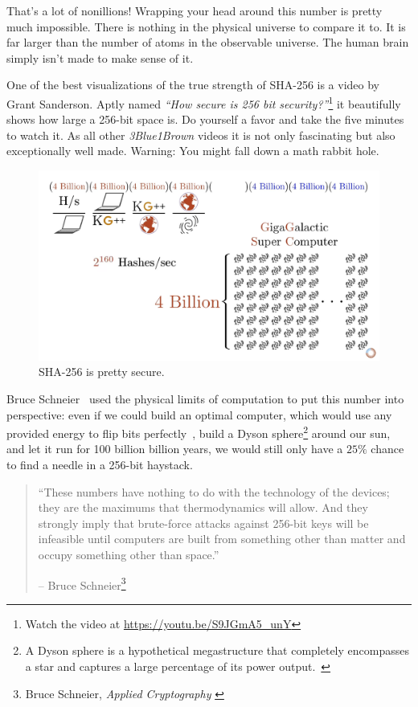 That's a lot of nonillions! Wrapping your head around this number is
pretty much impossible. There is nothing in the physical universe to
compare it to. It is far larger than the number of atoms in the
observable universe. The human brain simply isn't made to make sense of
it.

\newpage

One of the best visualizations of the true strength of SHA-256 is a video by
Grant Sanderson. Aptly named \textit{\enquote{How secure is 256 bit
security?}}\footnote{Watch the video at \url{https://youtu.be/S9JGmA5_unY}} it
beautifully shows how large a 256-bit space is. Do yourself a favor and take the
five minutes to watch it. As all other \textit{3Blue1Brown} videos it is not
only fascinating but also exceptionally well made. Warning: You might fall down
a math rabbit hole.

\begin{figure}
  \includegraphics{assets/images/youtube-vid-inverted.png}
  \caption{SHA-256 is pretty secure.}
  \label{fig:youtube-vid-inverted}
\end{figure}

Bruce Schneier~\cite{web:schneier} used the physical limits of computation to put this
number into perspective: even if we could build an optimal computer,
which would use any provided energy to flip bits perfectly~\cite{wiki:landauer}, build a
Dyson sphere\footnote{A Dyson sphere is a hypothetical megastructure that completely encompasses a star and captures a large percentage of its power output.~\cite{wiki:dyson}} around our sun, and let it run for 100 billion billion
years, we would still only have a $25\%$ chance to find a needle in a
256-bit haystack.

\begin{quotation}\begin{samepage}
\enquote{These numbers have nothing to do with the technology of the devices;
they are the maximums that thermodynamics will allow. And they
strongly imply that brute-force attacks against 256-bit keys will be
infeasible until computers are built from something other than matter
and occupy something other than space.}
\begin{flushright} -- Bruce Schneier\footnote{Bruce Schneier, \textit{Applied Cryptography} \cite{bruce-schneier}}
\end{flushright}\end{samepage}\end{quotation}


